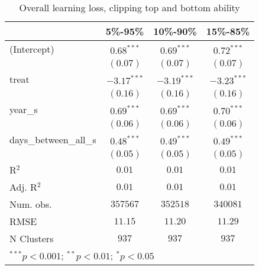 
\begin{table}
\begin{center}
\begin{tabular}{l c c c}
\hline
 & 5\%-95\% & 10\%-90\% & 15\%-85\% \\
\hline
(Intercept)           & $0.68^{***}$  & $0.69^{***}$  & $0.72^{***}$  \\
                      & $(0.07)$      & $(0.07)$      & $(0.07)$      \\
treat                 & $-3.17^{***}$ & $-3.19^{***}$ & $-3.23^{***}$ \\
                      & $(0.16)$      & $(0.16)$      & $(0.16)$      \\
year\_s               & $0.69^{***}$  & $0.69^{***}$  & $0.70^{***}$  \\
                      & $(0.06)$      & $(0.06)$      & $(0.06)$      \\
days\_between\_all\_s & $0.48^{***}$  & $0.49^{***}$  & $0.49^{***}$  \\
                      & $(0.05)$      & $(0.05)$      & $(0.05)$      \\
\hline
R$^2$                 & $0.01$        & $0.01$        & $0.01$        \\
Adj. R$^2$            & $0.01$        & $0.01$        & $0.01$        \\
Num. obs.             & $357567$      & $352518$      & $340081$      \\
RMSE                  & $11.15$       & $11.20$       & $11.29$       \\
N Clusters            & $937$         & $937$         & $937$         \\
\hline
\multicolumn{4}{l}{\scriptsize{$^{***}p<0.001$; $^{**}p<0.01$; $^{*}p<0.05$}}
\end{tabular}
\caption{Overall learning loss, clipping top and bottom ability}
\label{table:coefficients}
\end{center}
\end{table}
